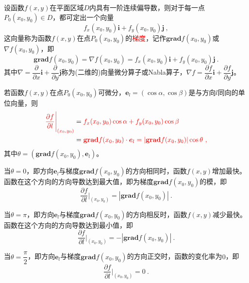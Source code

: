 \documentclass[12pt,a4paper]{article}
\renewcommand{\vec}[1]{\boldsymbol{#1}}
\begin{document}
设函数$f(x, y)$在平面区域$D$内具有一阶连续偏导数，则对于每一点$P_0(x_0, y_0) \in D$，都可定出一个向量
\begin{equation}
f_x(x_0, y_0) \vec{i} +f_y(x_0, y_0) \vec{j} ~,
\end{equation}
这向量称为函数$f(x, y)$在点$P_0(x_0, y_0)$的\textcolor{red}{梯度}，记作$\textbf{grad} f(x_0, y_0)$或$\nabla f(x_0, y_0)$，即
\begin{equation}
\textbf{grad} f(x_0, y_0) = \nabla f(x_0, y_0) = f_x(x_0, y_0) \vec{i} +f_y(x_0, y_0) \vec{j} ~.
\end{equation}
其中$\nabla = \dfrac{\partial }{\partial x} \vec{i} +\dfrac{\partial }{\partial y} \vec{j} $称为(二维的)向量微分算子或Nabla算子，$\nabla f = \dfrac{\partial f}{\partial x} \vec{i} +\dfrac{\partial f}{\partial y} \vec{j}$。


若函数$f(x, y)$在点$P_0(x_0, y_0)$可微分，$\vec{e}_l = (\cos \alpha, \cos \beta)$是与方向$l$同向的单位向量，则
\begin{align}
\nonumber \color{red} \dfrac{\partial f}{\partial l} \Bigg|_{(x_0, y_0)} &= \color{red} f_x (x_0, y_0) \cos \alpha +f_y (x_0, y_0) \cos \beta \\
&= \color{red} \textbf{grad} f(x_0, y_0) \cdot \vec{e}_l = |\textbf{grad} f(x_0, y_0) | \cos \theta ~,
\end{align}
其中$\theta = (\textbf{grad} f(x_0, y_0), \vec{e}_l)$。

当$\theta = 0$，即方向$\vec{e}_l$与梯度$\textbf{grad} f(x_0, y_0)$的方向相同时，函数$f(x, y)$增加最快。函数在这个方向的方向导数达到最大值，即为梯度$\textbf{grad} f(x_0, y_0)$的模，即
\begin{equation}
\dfrac{\partial f}{\partial l} \Bigg|_{(x_0, y_0)} = |\textbf{grad} f(x_0, y_0) | ~.
\end{equation}

当$\theta =\pi$，即方向$\vec{e}_l$与梯度$\textbf{grad} f(x_0, y_0)$的方向相反时，函数$f(x, y)$减少最快。函数在这个方向的方向导数达到最小值，即
\begin{equation}
\dfrac{\partial f}{\partial l} \Bigg|_{(x_0, y_0)} = -|\textbf{grad} f(x_0, y_0) | ~.
\end{equation}


当$\theta = \dfrac{\pi}{2}$，即方向$\vec{e}_l$与梯度$\textbf{grad} f(x_0, y_0)$的方向正交时，函数的变化率为$0$，即
\begin{equation}
\dfrac{\partial f}{\partial l} \Bigg|_{(x_0, y_0)} = 0 ~.
\end{equation}
\end{document}
